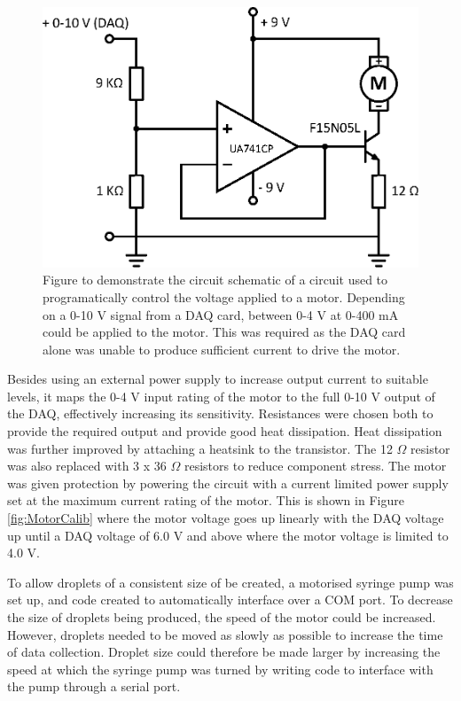 \documentclass{physics_article_B}
\begin{document}
            \begin{figure}[H]
                \centering
                \hspace*{-1.8cm}\includegraphics[scale=0.8]{Figures/MotorCircuit.eps}
                \caption{Figure to demonstrate the circuit schematic of a circuit used to programatically control the voltage applied to a motor. Depending on a 0-10 V signal from a DAQ card, between 0-4 V at 0-400 mA could be applied to the motor. This was required as the DAQ card alone was unable to produce sufficient current to drive the motor.}
                \label{fig:MotorCircuit}
            \end{figure}
        
        Besides using an external power supply to increase output current to suitable levels, it maps the 0-4 V input rating of the motor to the full 0-10 V output of the DAQ, effectively increasing its sensitivity. Resistances were chosen both to provide the required output and provide good heat dissipation. Heat dissipation was further improved by attaching a heatsink to the transistor. The 12 $\Omega$ resistor was also replaced with 3 x 36 $\Omega$ resistors to reduce component stress. The motor was given protection by powering the circuit with a current limited power supply set at the maximum current rating of the motor. This is shown in Figure \ref{fig:MotorCalib} where the motor voltage goes up linearly with the DAQ voltage up until a DAQ voltage of 6.0 V and above where the motor voltage is limited to 4.0 V.
        
        To allow droplets of a consistent size of be created, a motorised syringe pump was set up, and code created to automatically interface over a COM port. To decrease the size of droplets being produced, the speed of the motor could be increased. However, droplets needed to be moved as slowly as possible to increase the time of data collection. Droplet size could therefore be made larger by increasing the speed at which the syringe pump was turned by writing code to interface with the pump through a serial port.
        
\end{document}
